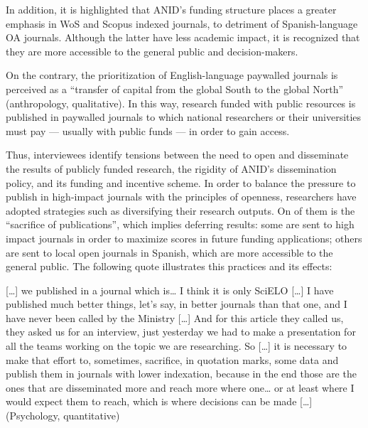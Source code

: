 \documentclass[
  letterpaper,
]{article}
\begin{document}
In addition, it is highlighted that ANID's funding structure places a
greater emphasis in WoS and Scopus indexed journals, to detriment of
Spanish-language OA journals. Although the latter have less academic
impact, it is recognized that they are more accessible to the general
public and decision-makers.

On the contrary, the prioritization of English-language paywalled
journals is perceived as a ``transfer of capital from the global South
to the global North'' (anthropology, qualitative). In this way, research
funded with public resources is published in paywalled journals to which
national researchers or their universities must pay --- usually with
public funds --- in order to gain access.

Thus, interviewees identify tensions between the need to open and
disseminate the results of publicly funded research, the rigidity of
ANID's dissemination policy, and its funding and incentive scheme. In
order to balance the pressure to publish in high-impact journals with
the principles of openness, researchers have adopted strategies such as
diversifying their research outputs. On of them is the ``sacrifice of
publications'', which implies deferring results: some are sent to high
impact journals in order to maximize scores in future funding
applications; others are sent to local open journals in Spanish, which
are more accessible to the general public. The following quote
illustrates this practices and its effects:

\begin{tcolorbox}[enhanced jigsaw, left=2mm, colframe=quarto-callout-color-frame, rightrule=.15mm, colback=white, opacityback=0, arc=.35mm, breakable, leftrule=.75mm, bottomrule=.15mm, toprule=.15mm]

{[}\ldots{]} we published in a journal which is\ldots{} I think it is
only SciELO {[}\ldots{]} I have published much better things, let's say,
in better journals than that one, and I have never been called by the
Ministry {[}\ldots{]} And for this article they called us, they asked us
for an interview, just yesterday we had to make a presentation for all
the teams working on the topic we are researching. So {[}\ldots{]} it is
necessary to make that effort to, sometimes, sacrifice, in quotation
marks, some data and publish them in journals with lower indexation,
because in the end those are the ones that are disseminated more and
reach more where one\ldots{} or at least where I would expect them to
reach, which is where decisions can be made {[}\ldots{]} (Psychology,
quantitative)

\end{tcolorbox}
\end{document}
